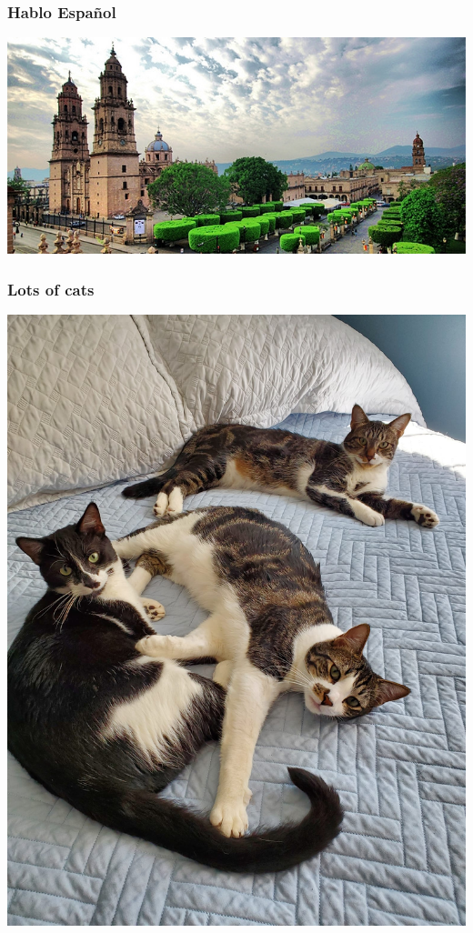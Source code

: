 \documentclass{beamer}
\begin{document}
\begin{frame}
\frametitle{Hablo Espa\~{n}ol}
\includegraphics[width=\textwidth]{morelia}
\end{frame}

\begin{frame}
\frametitle{Lots of cats}
\begin{center}
\includegraphics[height=\textheight]{cats}
\end{center}
\end{frame}
\end{document}
